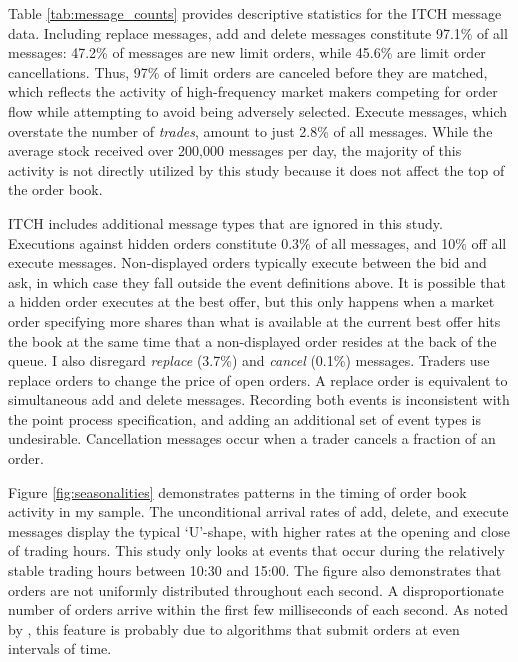 	Table \ref{tab:message_counts} provides descriptive statistics for the ITCH message data. Including replace messages, add and delete messages constitute 97.1\% of all messages: 47.2\% of messages are new limit orders, while 45.6\% are limit order cancellations. Thus, 97\% of limit orders are canceled before they are matched, which reflects the activity of high-frequency market makers competing for order flow while attempting to avoid being adversely selected. Execute messages, which overstate the number of \textit{trades}, amount to just 2.8\% of all messages. While the average stock received over 200,000 messages per day, the majority of this activity is not directly utilized by this study because it does not affect the top of the order book.

	ITCH includes additional message types that are ignored in this study. Executions against hidden orders constitute 0.3\% of all messages, and 10\% off all execute messages. Non-displayed orders typically execute between the bid and ask, in which case they fall outside the event definitions above. It is possible that a hidden order executes at the best offer, but this only happens when a market order specifying more shares than what is available at the current best offer hits the book at the same time that a non-displayed order resides at the back of the queue. I also disregard \textit{replace} (3.7\%) and \textit{cancel} (0.1\%) messages.
	Traders use replace orders to change the price of open orders. A replace order is equivalent to simultaneous add and delete messages. Recording both events is inconsistent with the point process specification, and adding an additional set of event types is undesirable. Cancellation messages occur when a trader cancels a fraction of an order.

	Figure \ref{fig:seasonalities} demonstrates patterns in the timing of order book activity in my sample. The unconditional arrival rates of add, delete, and execute messages display the typical `U'-shape, with higher rates at the opening and close of trading hours. This study only looks at events that occur during the relatively stable trading hours between 10:30 and 15:00. The figure also demonstrates that orders are not uniformly distributed throughout each second. A disproportionate number of orders arrive within the first few milliseconds of each second. As noted by \cite{Hasbrouck2013}, this feature is probably due to algorithms that submit orders at even intervals of time.

